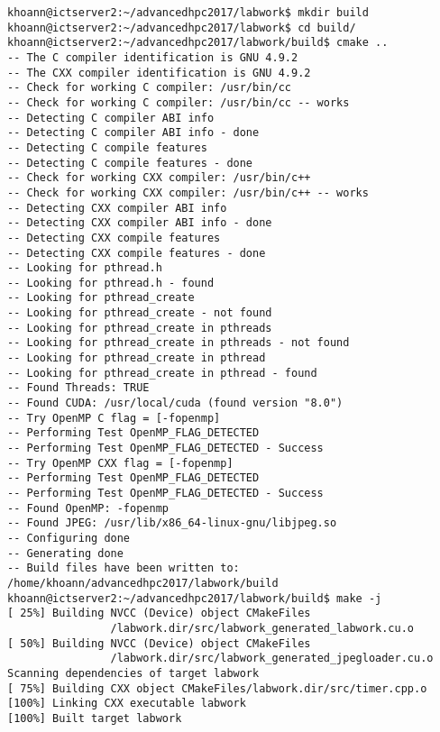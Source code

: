 \documentclass[a4paper,11pt, notitlepage]{article}
\begin{document}
\begin{verbatim}
khoann@ictserver2:~/advancedhpc2017/labwork$ mkdir build
khoann@ictserver2:~/advancedhpc2017/labwork$ cd build/
khoann@ictserver2:~/advancedhpc2017/labwork/build$ cmake ..
-- The C compiler identification is GNU 4.9.2
-- The CXX compiler identification is GNU 4.9.2
-- Check for working C compiler: /usr/bin/cc
-- Check for working C compiler: /usr/bin/cc -- works
-- Detecting C compiler ABI info
-- Detecting C compiler ABI info - done
-- Detecting C compile features
-- Detecting C compile features - done
-- Check for working CXX compiler: /usr/bin/c++
-- Check for working CXX compiler: /usr/bin/c++ -- works
-- Detecting CXX compiler ABI info
-- Detecting CXX compiler ABI info - done
-- Detecting CXX compile features
-- Detecting CXX compile features - done
-- Looking for pthread.h
-- Looking for pthread.h - found
-- Looking for pthread_create
-- Looking for pthread_create - not found
-- Looking for pthread_create in pthreads
-- Looking for pthread_create in pthreads - not found
-- Looking for pthread_create in pthread
-- Looking for pthread_create in pthread - found
-- Found Threads: TRUE  
-- Found CUDA: /usr/local/cuda (found version "8.0") 
-- Try OpenMP C flag = [-fopenmp]
-- Performing Test OpenMP_FLAG_DETECTED
-- Performing Test OpenMP_FLAG_DETECTED - Success
-- Try OpenMP CXX flag = [-fopenmp]
-- Performing Test OpenMP_FLAG_DETECTED
-- Performing Test OpenMP_FLAG_DETECTED - Success
-- Found OpenMP: -fopenmp  
-- Found JPEG: /usr/lib/x86_64-linux-gnu/libjpeg.so  
-- Configuring done
-- Generating done
-- Build files have been written to: /home/khoann/advancedhpc2017/labwork/build
khoann@ictserver2:~/advancedhpc2017/labwork/build$ make -j
[ 25%] Building NVCC (Device) object CMakeFiles
				/labwork.dir/src/labwork_generated_labwork.cu.o
[ 50%] Building NVCC (Device) object CMakeFiles
				/labwork.dir/src/labwork_generated_jpegloader.cu.o
Scanning dependencies of target labwork
[ 75%] Building CXX object CMakeFiles/labwork.dir/src/timer.cpp.o
[100%] Linking CXX executable labwork
[100%] Built target labwork
\end{verbatim}
\end{document}
